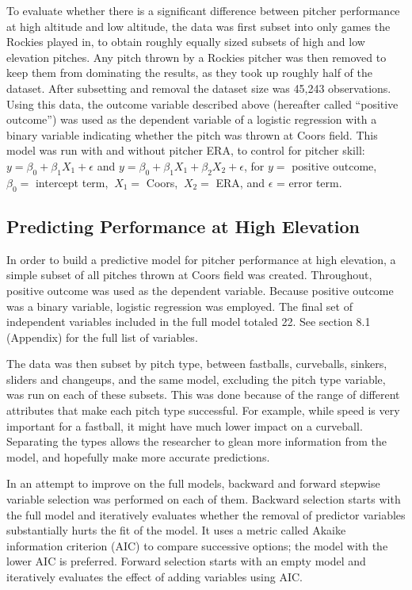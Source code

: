 \documentclass{article}
\begin{document}
To evaluate whether there is a significant difference between pitcher performance at high altitude and low altitude, the data was first subset into only games the Rockies played in, to obtain roughly equally sized subsets of high and low elevation pitches. Any pitch thrown by a Rockies pitcher was then removed to keep them from dominating the results, as they took up roughly half of the dataset. After subsetting and removal the dataset size was 45,243 observations. Using this data, the outcome variable described above (hereafter called ``positive outcome”) was used as the dependent variable of a logistic regression with a binary variable indicating whether the pitch was thrown at Coors field. This model was run with and without pitcher ERA, to control for pitcher skill: \(y = \beta_0 + \beta_1 X_1 + \epsilon\) and \(y = \beta_0 + \beta_1 X_1 + \beta_2 X_2 + \epsilon\), for \(y =\) positive outcome, \(\beta_0 =\) intercept term, \(\ X_1 =\) Coors, \(\ X_2 =\) ERA, and \(\epsilon\) = error term.

\subsection{Predicting Performance at High Elevation}

In order to build a predictive model for pitcher performance at high elevation, a simple subset of all pitches thrown at Coors field was created. Throughout, positive outcome was used as the dependent variable. Because positive outcome was a binary variable, logistic regression was employed. The final set of independent variables included in the full model totaled 22. See section 8.1 (Appendix) for the full list of variables.

The data was then subset by pitch type, between fastballs, curveballs, sinkers, sliders and changeups, and the same model, excluding the pitch type variable, was run on each of these subsets. This was done because of the range of different attributes that make each pitch type successful. For example, while speed is very important for a fastball, it might have much lower impact on a curveball. Separating the types allows the researcher to glean more information from the model, and hopefully make more accurate predictions. 

In an attempt to improve on the full models, backward and forward stepwise variable selection was performed on each of them. Backward selection starts with the full model and iteratively evaluates whether the removal of predictor variables substantially hurts the fit of the model. It uses a metric called Akaike information criterion (AIC) to compare successive options; the model with the lower AIC is preferred. Forward selection starts with an empty model and iteratively evaluates the effect of adding variables using AIC.
\end{document}
